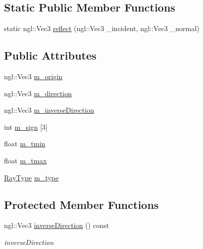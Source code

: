 \subsection*{Static Public Member Functions}
\begin{DoxyCompactItemize}
\item 
static ngl\+::\+Vec3 \hyperlink{structRenderer_1_1Ray_aefb8158efe030eeb62c731a5b3b6ac06}{reflect} (ngl\+::\+Vec3 \+\_\+incident, ngl\+::\+Vec3 \+\_\+normal)
\end{DoxyCompactItemize}
\subsection*{Public Attributes}
\begin{DoxyCompactItemize}
\item 
ngl\+::\+Vec3 \hyperlink{structRenderer_1_1Ray_a5028bc5fd552d6878884c3fbd8bed02c}{m\+\_\+origin}
\item 
ngl\+::\+Vec3 \hyperlink{structRenderer_1_1Ray_ae8daac3681b1f08903bbd1cf4ba9c791}{m\+\_\+direction}
\item 
ngl\+::\+Vec3 \hyperlink{structRenderer_1_1Ray_a526b15d36b37ad8c7c39d88da8c936de}{m\+\_\+inverse\+Direction}
\item 
int \hyperlink{structRenderer_1_1Ray_a34e1eab13ea919449469e3353b14d6a3}{m\+\_\+sign} \mbox{[}3\mbox{]}
\item 
float \hyperlink{structRenderer_1_1Ray_a30ab8d94432ef36f4b8615f5d48304f6}{m\+\_\+tmin}
\item 
float \hyperlink{structRenderer_1_1Ray_aa61919436e6d1e655575943fd1803f66}{m\+\_\+tmax}
\item 
\hyperlink{structRenderer_1_1Ray_a4722d2a722c51993edca2496027414df}{Ray\+Type} \hyperlink{structRenderer_1_1Ray_a80f06b6cefceda2490e10441077e277b}{m\+\_\+type}
\end{DoxyCompactItemize}
\subsection*{Protected Member Functions}
\begin{DoxyCompactItemize}
\item 
ngl\+::\+Vec3 \hyperlink{structRenderer_1_1Ray_aa6bf2242c96eeff730f78b389e16b3e7}{inverse\+Direction} () const 
\begin{DoxyCompactList}\small\item\em inverse\+Direction \end{DoxyCompactList}\end{DoxyCompactItemize}


